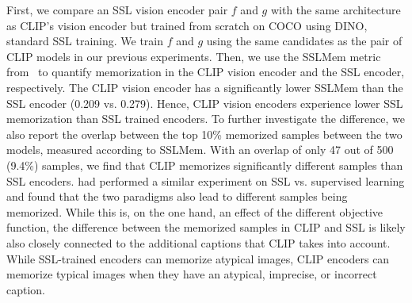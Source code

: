 First, we compare an SSL vision encoder pair $f$ and $g$ with the same architecture as CLIP's vision encoder but trained from scratch on COCO using DINO, 
\ie standard SSL training. We train $f$ and $g$ using the same candidates as the pair of CLIP models in our previous experiments.
Then, we use the SSLMem metric from~\citet{wang2024memorization} to quantify memorization in the CLIP vision encoder and the SSL encoder, respectively.
The CLIP vision encoder has a significantly lower SSLMem than the SSL encoder (0.209 vs. 0.279). 
Hence, CLIP vision encoders experience lower SSL memorization than SSL trained encoders.
To further investigate the difference, we also report the overlap between the top 10\% memorized samples between the two models, measured according to SSLMem. With an overlap of only 47 out of 500 (9.4\%) samples, we find that CLIP memorizes significantly different samples than SSL encoders.
\citet{wang2024memorization} had performed a similar experiment on SSL vs. supervised learning and found that the two paradigms also lead to different samples being memorized. 
While this is, on the one hand, an effect of the different objective function, the difference between the memorized samples in CLIP and SSL is likely also closely connected to the additional captions that CLIP takes into account. While SSL-trained encoders can memorize atypical images, CLIP encoders can memorize typical images when they have an atypical, imprecise, or incorrect caption.

